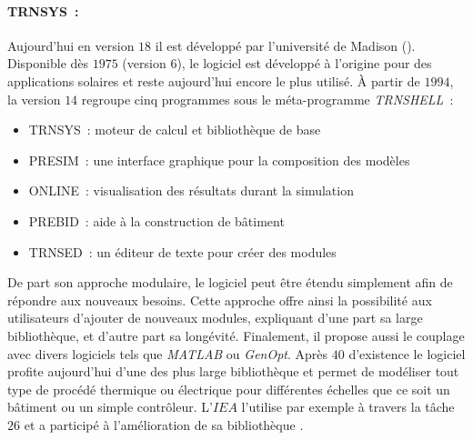 \paragraph{TRNSYS~:} %
\label{par:trnssys}
Aujourd’hui en version $18$ \parencite{Klein2017} il est développé par l’université de Madison ().
Disponible dès $1975$ (version $6$), le logiciel est développé à l’origine pour des applications
solaires et reste aujourd’hui encore le plus utilisé. À partir de $1994$, la version
$14$ regroupe cinq programmes sous le méta-programme \textit{TRNSHELL}~:
\begin{itemize}
    \item TRNSYS~: moteur de calcul et bibliothèque de base
    \item PRESIM~: une interface graphique pour la composition des modèles
    \item ONLINE~: visualisation des résultats durant la simulation
    \item PREBID~: aide à la construction de bâtiment
    \item TRNSED~: un éditeur de texte pour créer des modules
\end{itemize}
De part son approche modulaire, le logiciel peut être étendu simplement afin de répondre aux
nouveaux besoins. Cette approche offre ainsi la possibilité aux utilisateurs
d’ajouter de nouveaux modules, expliquant d’une part sa large bibliothèque, et d’autre part
sa longévité. Finalement, il propose aussi le couplage avec divers logiciels tels que
\textit{MATLAB} ou \textit{GenOpt}. Après $40$ d’existence le logiciel profite aujourd’hui
d’une des plus large bibliothèque et permet de modéliser tout type de procédé thermique ou
électrique pour différentes échelles que ce soit un bâtiment ou un simple contrôleur.
L’$IEA$ l’utilise par exemple à travers la tâche $26$ et a participé à l’amélioration de
sa bibliothèque \parencite{Task26B2002}.

